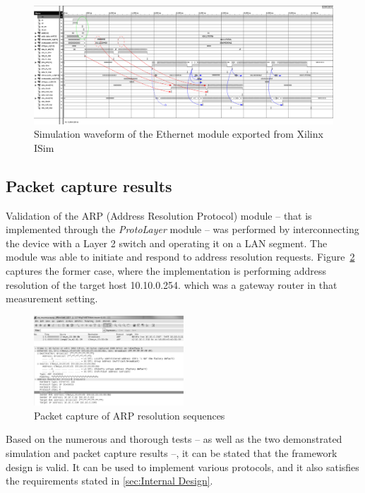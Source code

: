 \documentclass[conference]{IEEEtran}
\begin{document}
\begin{figure}[!htb]
    \centering
    \includegraphics[width=1\textwidth]{figures_raw/ether_tst_wave_annotated.png}
    \caption{Simulation waveform of the Ethernet module exported from Xilinx ISim}
    \label{fig:eth_sim}
\end{figure}

\subsection{Packet capture results}

Validation of the ARP (Address Resolution Protocol) module -- that is implemented through the \emph{ProtoLayer} module -- was performed by interconnecting the device with a Layer 2 switch and operating it on a LAN segment. The module was able to initiate and respond to address resolution requests. Figure~\ref{fig:pcap_arp_seq} captures the former case, where the implementation is performing address resolution of the target host 10.10.0.254. which was a gateway router in that measurement setting.

\begin{figure}[!htb]
    \centering
    \includegraphics[width=0.5\textwidth]{figures_raw/arp_transaction.png}
    \caption{Packet capture of ARP resolution sequences}
    \label{fig:pcap_arp_seq}
\end{figure}

Based on the numerous and thorough tests -- as well as the two demonstrated simulation and packet capture results --, it can be stated that the framework design is valid. It can be used to implement various protocols, and it also satisfies the requirements stated in \ref{sec:Internal Design}.
\end{document}
